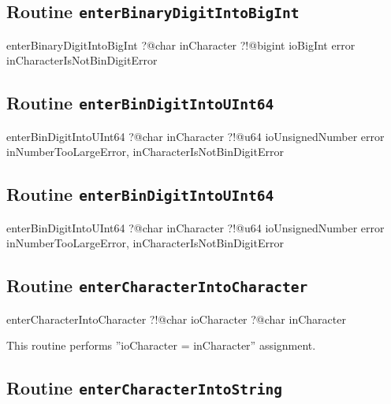 \subsection{Routine \texttt{enterBinaryDigitIntoBigInt}}

\begin{galgas4}
enterBinaryDigitIntoBigInt ?@char inCharacter
                           ?!@bigint ioBigInt
                           error inCharacterIsNotBinDigitError
\end{galgas4}

\subsection{Routine \texttt{enterBinDigitIntoUInt64}}

\begin{galgas4}
enterBinDigitIntoUInt64 ?@char inCharacter
                        ?!@u64 ioUnsignedNumber
                        error inNumberTooLargeError,
                              inCharacterIsNotBinDigitError
\end{galgas4}

\subsection{Routine \texttt{enterBinDigitIntoUInt64}}

\begin{galgas4}
enterBinDigitIntoUInt64 ?@char inCharacter
                        ?!@u64 ioUnsignedNumber
                        error inNumberTooLargeError,
                              inCharacterIsNotBinDigitError
\end{galgas4}

\subsection{Routine \texttt{enterCharacterIntoCharacter}}

\begin{galgas4}
enterCharacterIntoCharacter ?!@char ioCharacter
                            ?@char inCharacter
\end{galgas4}

This routine performs ''ioCharacter = inCharacter'' assignment.

\subsection{Routine \texttt{enterCharacterIntoString}}

